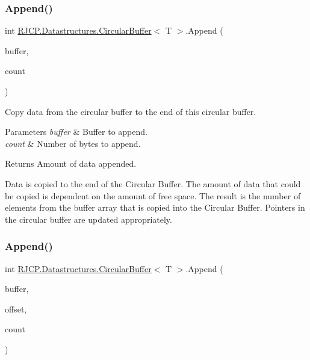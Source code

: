 \subsubsection{\texorpdfstring{Append()}{Append()}\hspace{0.1cm}{\footnotesize\ttfamily [4/6]}}
{\footnotesize\ttfamily int \mbox{\hyperlink{class_r_j_c_p_1_1_datastructures_1_1_circular_buffer}{R\+J\+C\+P.\+Datastructures.\+Circular\+Buffer}}$<$ T $>$.Append (\begin{DoxyParamCaption}\item[{\mbox{\hyperlink{class_r_j_c_p_1_1_datastructures_1_1_circular_buffer}{Circular\+Buffer}}$<$ T $>$}]{buffer,  }\item[{int}]{count }\end{DoxyParamCaption})}



Copy data from the circular buffer to the end of this circular buffer. 


\begin{DoxyParams}{Parameters}
{\em buffer} & Buffer to append.\\
\hline
{\em count} & Number of bytes to append.\\
\hline
\end{DoxyParams}
\begin{DoxyReturn}{Returns}
Amount of data appended.
\end{DoxyReturn}


Data is copied to the end of the Circular Buffer. The amount of data that could be copied is dependent on the amount of free space. The result is the number of elements from the {\ttfamily buffer} array that is copied into the Circular Buffer. Pointers in the circular buffer are updated appropriately. \mbox{\label{class_r_j_c_p_1_1_datastructures_1_1_circular_buffer_ad2b00c844d2d762e349b5cd0be4a6b9d}} 
\subsubsection{\texorpdfstring{Append()}{Append()}\hspace{0.1cm}{\footnotesize\ttfamily [5/6]}}
{\footnotesize\ttfamily int \mbox{\hyperlink{class_r_j_c_p_1_1_datastructures_1_1_circular_buffer}{R\+J\+C\+P.\+Datastructures.\+Circular\+Buffer}}$<$ T $>$.Append (\begin{DoxyParamCaption}\item[{\mbox{\hyperlink{class_r_j_c_p_1_1_datastructures_1_1_circular_buffer}{Circular\+Buffer}}$<$ T $>$}]{buffer,  }\item[{int}]{offset,  }\item[{int}]{count }\end{DoxyParamCaption})}



